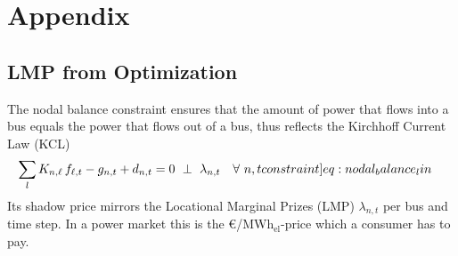 \documentclass[11pt,twocolumn]{article}
\newcommand{\resultsin}[1]{\hspace{6pt} \bot  \hspace{6pt} #1}
\newcommand{\Forall}[1]{\hspace{10pt} \forall \,\, #1 }
\newcommand{\nodalgeneration}[1][n]{g_{#1,t}}
\newcommand{\flow}{f_{\ell,t}}
\newcommand{\lmp}[1][n]{\lambda_{#1,t}}
\newcommand{\nodaldemand}[1][n]{d_{#1,t}}
\newcommand{\incidence}[1][n]{K_{#1,\ell}}
\newcommand{\megawatthour}{MWh$_\text{el}$}
\begin{document}
\section{Appendix}

\renewcommand\theequation{\thesection.\arabic{equation}}
\setcounter{equation}{0}

\renewcommand\thefigure{\thesection.\arabic{figure}}    
\setcounter{figure}{0}    

\subsection{LMP from Optimization}
The nodal balance constraint ensures that the amount of power that flows into a bus equals the power that flows out of a bus, thus reflects the Kirchhoff Current Law (KCL)
\begin{align}
    \sum_l \incidence \, \flow  - \nodalgeneration + \nodaldemand &= 0 \resultsin{\lmp} \Forall{n,t}
    \label[constraint]{eq:nodal_balance_lin}
\end{align}
Its shadow price mirrors the Locational Marginal Prizes (LMP) $\lmp$ per bus and time step. In a power market this is the \euro/\megawatthour-price which a consumer has to pay.\\
\end{document}
